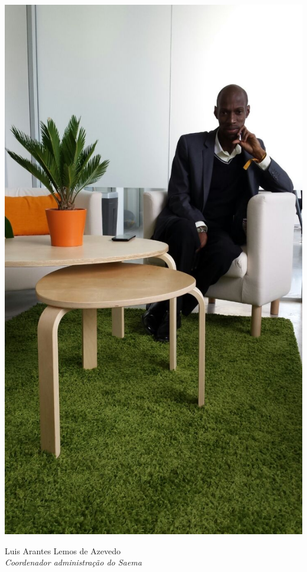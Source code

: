   \begin{figurebox}
    \vspace{20pt}
    \centering
    \includegraphics[scale=0.3]{luis.jpg}

     Luis Arantes Lemos de Azevedo\\
    {\sl Coordenador administração do Saema}
    \vspace{20pt}
  \end{figurebox}

\newpage




